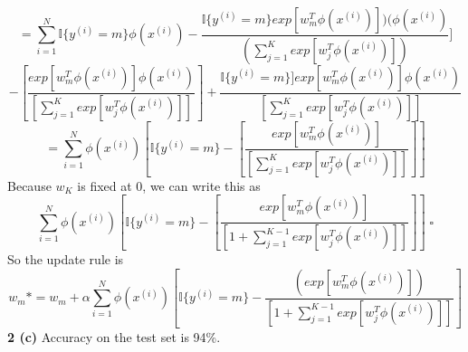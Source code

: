 \documentclass[12 pt]{article}        	%
\begin{document}
\[
=  \sum_{i=1}^{N} \mathbb{I} \{ y^{(i)} = m \} \phi(x^{(i)}) 
    - \frac{
      \mathbb{I} \{ y^{(i)} = m \} exp[ w_{m}^{T} \phi(x^{(i)}) ] ) (\phi(x^{(i)})
      }{
        ( \sum_{j=1}^{K} exp[ w_{j}^{T} \phi(x^{(i)}) ] )
      }
  ]
\]
\[
  - [
    \frac{
      exp[ w_{m}^{T} \phi(x^{(i)})] \phi(x^{(i)})
    }{
      [ \sum_{j=1}^{K} exp[ w_{j}^{T} \phi(x^{(i)}) ] ]
    } 
  ]
  + 
    \frac{
      \mathbb{I}\{ y^{(i)} = m \} ]
      exp[ w_{m}^{T} \phi(x^{(i)})] \phi(x^{(i)})
    }{
      [ \sum_{j=1}^{K} exp[ w_{j}^{T} \phi(x^{(i)}) ] ]
    } 
\]
\[
  = \sum_{i=1}^{N} \phi(x^{(i)}) 
  [ 
    \mathbb{I} \{ y^{(i)} = m \} 
    - [
      \frac{
        exp[ w_{m}^{T} \phi(x^{(i)})]
      }{
        [ \sum_{j=1}^{K} exp[ w_{j}^{T} \phi(x^{(i)}) ] ]
      } 
    ]
  ]
\]
Because $ w_K $ is fixed at 0, we can write this as 
\[
  \sum_{i=1}^{N} \phi(x^{(i)}) 
  [ 
    \mathbb{I} \{ y^{(i)} = m \} 
    - [
      \frac{
        exp[ w_{m}^{T} \phi(x^{(i)})]
      }{
        [ 1 + \sum_{j=1}^{K-1} exp[ w_{j}^{T} \phi(x^{(i)}) ] ]
      } 
    ]
  ] \; \square
\] 
So the update rule is 
\[
  w_m * = w_m  + \alpha 
  \sum_{i=1}^{N} \phi(x^{(i)})
  [
    \mathbb{I} \{ y^{(i)} = m \} 
    - \frac{
        ( exp[ w_{m}^{T} \phi(x^{(i)}) ] )
      }{
        [ 1 + \sum_{j=1}^{K-1} exp[ w_{j}^{T} \phi(x^{(i)}) ] ]
      }
  ]
\]
\textbf{2 (c)} Accuracy on the test set is 94\%. 
\end{document}
